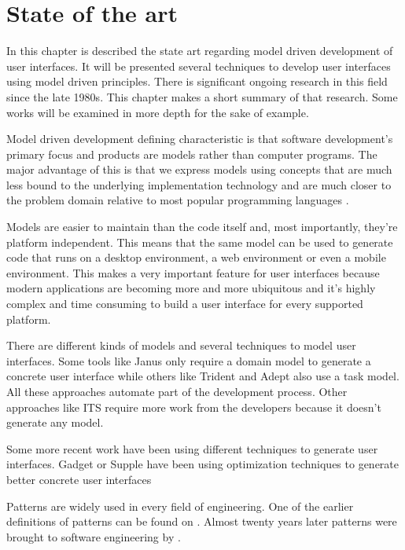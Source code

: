 \chapter{State of the art}
In this chapter is described the state art regarding model driven development of user interfaces. It will be presented several techniques to develop user interfaces using model driven principles. There is significant ongoing research in this field since the late 1980s. This chapter makes a short summary of that research. Some works will be examined in more depth for the sake of example. 

Model driven development defining characteristic is that software development's primary focus and products are models rather than computer programs. The major advantage of this is that we express models using concepts that are much less bound to the underlying implementation technology and are much closer to the problem domain relative to most popular programming languages \cite{The_Pragmatics_of_Model-Driven_Development}.

Models are easier to maintain than the code itself and, most importantly, they're platform independent. This means that the same model can be used to generate code that runs on a desktop environment, a web environment or even a mobile environment. This makes a very important feature for user interfaces because modern applications are becoming more and more ubiquitous and it's highly complex and time consuming to build a user interface for every supported platform.

There are different kinds of models and several techniques to model user interfaces. Some tools like Janus\cite{janus} only require a domain model to generate a concrete user interface while others like Trident\cite{trident1, trident2} and Adept\cite{adept1} also use a task model. All these approaches automate part of the development process. Other approaches like ITS\cite{ITS} require more work from the developers because it doesn't generate any model.

Some more recent work have been using different techniques to generate user interfaces. Gadget\cite{gadget} or Supple\cite{supple} have been using optimization techniques to generate better concrete user interfaces

Patterns are widely used in every field of engineering. One of the earlier definitions of patterns can be found on \cite{A_Pattern_Language_Towns_Buildings_Construction}. Almost twenty years later patterns were brought to software engineering by \cite{Design_Patterns}.

